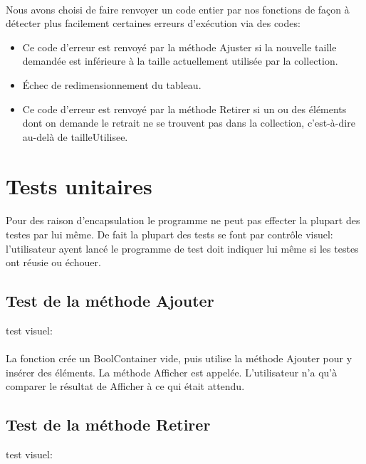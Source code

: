 \documentclass[a4paper, 12pts]{article}
\begin{document}
\paragraph{}
Nous avons choisi de faire renvoyer un code entier par nos fonctions de façon à détecter plus facilement certaines erreurs d’exécution via des codes:
\begin{itemize}
	\item 
Ce code d’erreur est renvoyé par la méthode Ajuster si la nouvelle taille demandée est inférieure à la taille actuellement utilisée par la collection.
	\item 
Échec de redimensionnement du tableau.
	\item 
Ce code d’erreur est renvoyé par la méthode Retirer si un ou des éléments dont on demande le retrait ne se trouvent pas dans la collection, c’est-à-dire au-delà de tailleUtilisee.
\end{itemize}


\section{Tests unitaires}

\paragraph{}
Pour des raison d'encapsulation le programme ne peut pas effecter la plupart des testes par lui même. De fait la plupart des tests se font par contrôle visuel: l'utilisateur ayent lancé le programme de test doit indiquer lui même si les testes ont réusie ou échouer.

\subsection{Test de la méthode Ajouter}
test visuel:
\paragraph{}
La fonction crée un BoolContainer vide, puis utilise la méthode Ajouter pour y insérer des éléments. La méthode Afficher est appelée. L’utilisateur n’a qu’à comparer le résultat de Afficher à ce qui était attendu.

\subsection{Test de la méthode Retirer}
test visuel:
\end{document}
